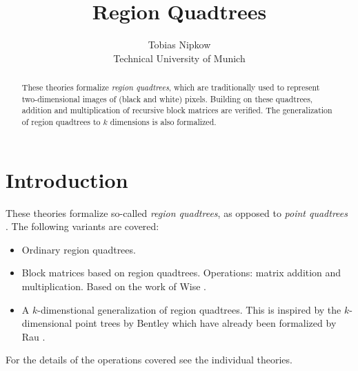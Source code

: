 \documentclass[11pt,a4paper]{article}
\begin{document}
\title{Region Quadtrees}
\author{Tobias Nipkow\\Technical University of Munich}
\maketitle

\begin{abstract}
These theories formalize \emph{region quadtrees}, which are traditionally used
to represent two-dimensional images of (black and white) pixels.
Building on these quadtrees, addition and multiplication of recursive
block matrices are verified.
The generalization of region quadtrees to $k$ dimensions is also formalized.
\end{abstract}

\section{Introduction}

These theories formalize so-called \emph{region quadtrees}, as opposed to \emph{point quadtrees}
\cite{Samet84,Samet90,Aluru04}.
The following variants are covered:
\begin{itemize}
\item Ordinary region quadtrees.
\item Block matrices based on region quadtrees. Operations: matrix addition and multiplication.
  Based on the work of Wise \cite{Wise84,Wise85,Wise86,Wise87,Wise92}.
\item A $k$-dimenstional generalization of region quadtrees.
This is inspired by the $k$-dimensional point trees by Bentley \cite{Bentley75,FriedmanBF77}
which have already been formalized by Rau \cite{KD_Tree-AFP}.
\end{itemize}
For the details of the operations covered see the individual theories.

\tableofcontents

\newpage





\end{document}
